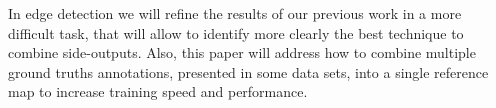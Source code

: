 {\color{red}





}

In edge detection we will refine the results of our previous work \cite{Reis:2019} in a more difficult task, that will allow to identify more clearly the best technique to combine side-outputs.
Also, this paper will address how to combine multiple ground truths annotations, presented in some data sets, into a single reference map to increase training speed and performance.

